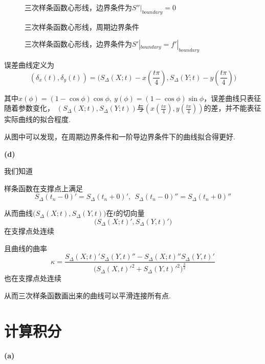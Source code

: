 \documentclass[UTF8]{ctexart}
\begin{document}
\begin{figure}[H]
\centering
\subfigure[拟合曲线与严格曲线图像]{\texttt{[image: 3-c-1]}}
\subfigure[误差曲线]{\texttt{[image: 3-c-2]}}
\caption{三次样条函数心形线，边界条件为$S''|_{boundary}=0$}
\end{figure}

\begin{figure}[H]
\centering
\subfigure[拟合曲线与严格曲线图像]{\texttt{[image: 3-c-3]}}
\subfigure[误差曲线]{\texttt{[image: 3-c-4]}}
\caption{三次样条函数心形线，周期边界条件}
\end{figure}

\begin{figure}[H]
\centering
\subfigure[拟合曲线与严格曲线图像]{\texttt{[image: 3-c-5]}}
\subfigure[误差曲线]{\texttt{[image: 3-c-6]}}
\caption{三次样条函数心形线，边界条件为$S'|_{boundary}=f'|_{boundary}$}
\end{figure}

误差曲线定义为
$$(\delta_x(t),\delta_y(t))=\Big(S_{\Delta}(X;t)-x(\frac{t\pi}{4}),S_{\Delta}(Y;t)-y(\frac{t\pi}{4})\Big)$$

其中$x(\phi)=(1-\cos\phi)\cos\phi,\ y(\phi)=(1-\cos\phi)\sin\phi$，误差曲线只表征随着参数变化，
$(S_\Delta(X;t),S_\Delta(Y;t))$与$(x(\frac{t\pi}{4}),y(\frac{t\pi}{4}))$的差，并不能表征实际曲线的拟合程度.

从图中可以发现，在周期边界条件和一阶导边界条件下的曲线拟合得更好.

\noindent\textbf{(d)}

我们知道

样条函数在支撑点上满足$$S_\Delta(t_n-0)'=S_\Delta(t_n+0)',\ \ S_\Delta(t_n-0)''=S_\Delta(t_n+0)''$$

从而曲线$\Big(S_\Delta(X;t),S_\Delta(Y,t)\Big)$在$t$的切向量
$$\Big(S_\Delta(X;t)',S_\Delta(Y,t)'\Big)$$在支撑点处连续

且曲线的曲率$$\kappa=\frac{S_\Delta(X;t)'S_\Delta(Y,t)''-S_\Delta(X;t)''S_\Delta(Y,t)'}{\Big(S_\Delta(X,t)'^2+S_\Delta(Y,t)'^2\Big)^\frac{3}{2}}$$
也在支撑点处连续

从而三次样条函数画出来的曲线可以平滑连接所有点.

\section{计算积分}

\noindent\textbf{(a)}
\end{document}
